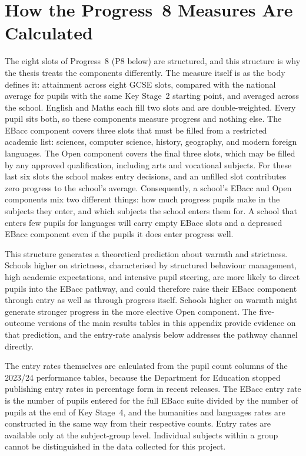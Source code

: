 \section{How the Progress~8 Measures Are Calculated}
\label{app:3A:p8mechanics}

The eight slots of Progress~8 (P8 below) are structured, and this
structure is why the thesis treats the components differently. The measure
itself is as the body defines it: attainment across eight GCSE slots,
compared with the national average for pupils with the same Key Stage~2
starting point, and averaged across the school. English and Maths each fill two slots and
are double-weighted. Every pupil sits both, so these components measure
progress and nothing else. The EBacc component covers three slots that must be filled
from a restricted academic list: sciences, computer science, history,
geography, and modern foreign languages. The Open component covers the final
three slots, which may be filled by any approved qualification, including
arts and vocational subjects. For these last six slots the school makes
entry decisions, and an unfilled slot contributes zero progress to the
school's average. Consequently, a school's EBacc and Open components mix two
different things: how much progress pupils make in the subjects they enter,
and which subjects the school enters them for. A school that enters few
pupils for languages will carry empty EBacc slots and a depressed EBacc
component even if the pupils it does enter progress well.

This structure generates a theoretical prediction about warmth and
strictness. Schools higher on strictness, characterised by structured
behaviour management, high academic expectations, and intensive pupil
steering, are more likely to direct pupils into the EBacc pathway, and could therefore raise their EBacc component through entry as well as through progress itself. Schools higher on warmth might generate stronger
progress in the more elective Open component. The five-outcome versions of the main results tables in this appendix
provide evidence on that prediction, and the entry-rate analysis below
addresses the pathway channel directly.

The entry rates themselves are calculated from the pupil count columns of
the 2023/24 performance tables, because the Department for Education
stopped publishing entry rates in percentage form in recent releases. The
EBacc entry rate is the number of pupils entered for the full EBacc suite
divided by the number of pupils at the end of Key Stage~4, and the
humanities and languages rates are constructed in the same way from their
respective counts. Entry rates are available only at the subject-group
level. Individual subjects within a group cannot be distinguished in the
data collected for this project.

